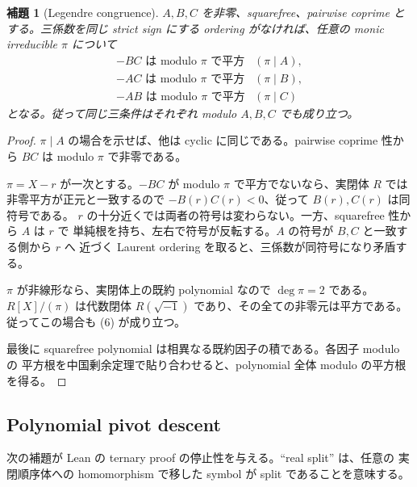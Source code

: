 \documentclass[uplatex,dvipdfmx]{jsarticle}
\newtheorem{lemma}[theorem]{補題}
\theoremstyle{definition}
\theoremstyle{remark}
\begin{document}
\begin{lemma}[Legendre congruence]\label{lem:legendre-congruences-ja}
$A,B,C$ を非零、squarefree、pairwise coprime とする。三係数を同じ strict sign にする
ordering がなければ、任意の monic irreducible $\pi$ について
\[
\begin{array}{ll}
 -BC\text{ は modulo }\pi\text{ で平方} &(\pi\mid A),\\
 -AC\text{ は modulo }\pi\text{ で平方} &(\pi\mid B),\\
 -AB\text{ は modulo }\pi\text{ で平方} &(\pi\mid C)
\end{array}                                             \tag{6}
\]
となる。従って同じ三条件はそれぞれ modulo $A,B,C$ でも成り立つ。
\end{lemma}
\begin{proof}
$\pi\mid A$ の場合を示せば、他は cyclic に同じである。pairwise coprime 性から
$BC$ は modulo $\pi$ で非零である。

$\pi=X-r$ が一次とする。$-BC$ が modulo $\pi$ で平方でないなら、実閉体 $R$ では
非零平方が正元と一致するので $-B(r)C(r)<0$、従って $B(r),C(r)$ は同符号である。
$r$ の十分近くでは両者の符号は変わらない。一方、squarefree 性から $A$ は $r$ で
単純根を持ち、左右で符号が反転する。$A$ の符号が $B,C$ と一致する側から $r$ へ
近づく Laurent ordering を取ると、三係数が同符号になり矛盾する。

$\pi$ が非線形なら、実閉体上の既約 polynomial なので $\deg\pi=2$ である。
$R[X]/(\pi)$ は代数閉体 $R(\sqrt{-1})$ であり、その全ての非零元は平方である。
従ってこの場合も (6) が成り立つ。

最後に squarefree polynomial は相異なる既約因子の積である。各因子 modulo の
平方根を中国剰余定理で貼り合わせると、polynomial 全体 modulo の平方根を得る。
\end{proof}

\subsection{Polynomial pivot descent}

次の補題が Lean の ternary proof の停止性を与える。``real split'' は、任意の
実閉順序体への homomorphism で移した symbol が split であることを意味する。
\end{document}
